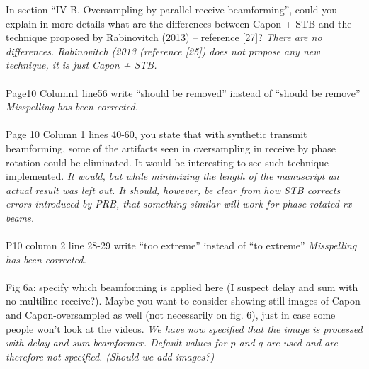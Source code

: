 \documentclass{article}
\begin{document}
In section “IV-B. Oversampling by parallel receive beamforming”, could you explain in more details what are the differences between Capon + STB and the technique proposed by Rabinovitch (2013) – reference [27]?
\textit{There are no differences. Rabinovitch (2013 (reference [25]) does not propose any new technique, it is just Capon + STB.}
\\\\
Page10 Column1 line56  write “should be removed” instead of “should be remove”
\textit{Misspelling has been corrected.}
\\\\
Page 10 Column 1 lines 40-60, you state that with synthetic transmit beamforming, some of the artifacts seen in oversampling in receive by phase rotation could be eliminated. It would be interesting to see such technique implemented.
\textit{It would, but while minimizing the length of the manuscript an actual result was left out. It should, however, be clear from how STB corrects errors introduced by PRB, that something similar will work for phase-rotated rx-beams.}
\\\\
P10 column 2 line 28-29 write “too extreme” instead of “to extreme”
\textit{Misspelling has been corrected.}
\\\\
Fig 6a: specify which beamforming is applied here (I suspect delay and sum with no multiline receive?). Maybe you want to consider showing still images of Capon and Capon-oversampled as well (not necessarily on fig. 6), just in case some people won’t look at the videos.
\textit{We have now specified that the image is processed with delay-and-sum beamformer. Default values for $p$ and $q$ are used and are therefore not specified. (Should we add images?)}
\end{document}
